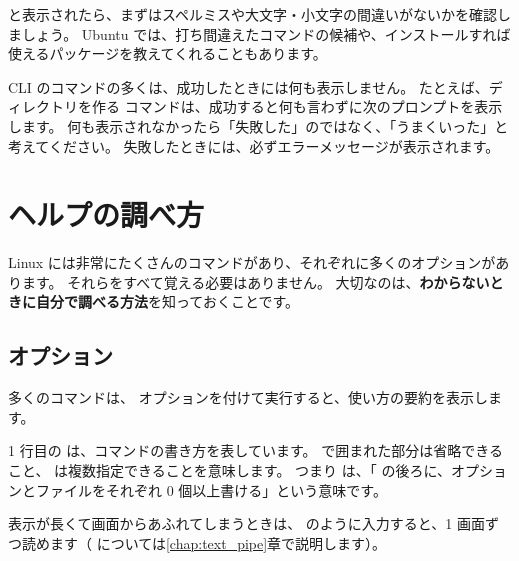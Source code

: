 \begin{terminal}[コマンドの基本形]
 と表示されたら、まずはスペルミスや大文字・小文字の間違いがないかを確認しましょう。
Ubuntu では、打ち間違えたコマンドの候補や、インストールすれば使えるパッケージを教えてくれることもあります。

\begin{point}[便りがないのはよい便り]
  CLI のコマンドの多くは、成功したときには何も表示しません。
  たとえば、ディレクトリを作る  コマンドは、成功すると何も言わずに次のプロンプトを表示します。
  何も表示されなかったら「失敗した」のではなく、「うまくいった」と考えてください。
  失敗したときには、必ずエラーメッセージが表示されます。
\end{point}

\section{ヘルプの調べ方}
\label{sec:terminal-help}

Linux には非常にたくさんのコマンドがあり、それぞれに多くのオプションがあります。
それらをすべて覚える必要はありません。
大切なのは、\textbf{わからないときに自分で調べる方法}を知っておくことです。

\subsection{ オプション}

多くのコマンドは、 オプションを付けて実行すると、使い方の要約を表示します。


1 行目の  は、コマンドの書き方を表しています。
\cmd{[ ]} で囲まれた部分は省略できること、 は複数指定できることを意味します。
つまり  は、「 の後ろに、オプションとファイルをそれぞれ 0 個以上書ける」という意味です。

表示が長くて画面からあふれてしまうときは、 のように入力すると、1 画面ずつ読めます（\cmd{|} については\ref{chap:text_pipe}章で説明します）。


\end{terminal}
